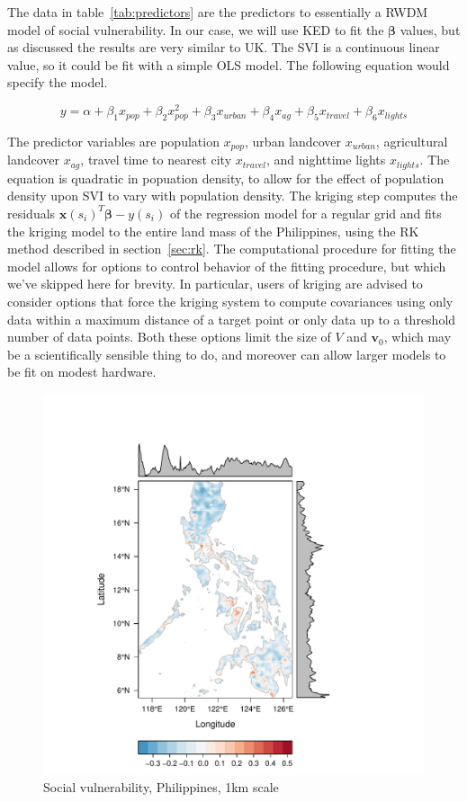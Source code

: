 \documentclass[draft]{article}
\begin{document}
The data in table~\ref{tab:predictors} are the predictors to essentially a RWDM model of social vulnerability.  In our case, we will use KED to fit the $\bm{\beta}$ values, but as discussed the results are very similar to UK.  The SVI is a continuous linear value, so it could be fit with a simple OLS model.  The following equation would specify the model.

\[y=\alpha+\beta_1x_{pop}+\beta_2x_{pop}^2+\beta_3x_{urban}+\beta_4x_{ag}+\beta_5x_{travel}+\beta_6x_{lights}\]

The predictor variables are population $x_{pop}$, urban landcover $x_{urban}$, agricultural landcover $x_{ag}$, travel time to nearest city $x_{travel}$, and nighttime lights $x_{lights}$.  The equation is quadratic in popuation density, to allow for the effect of population density upon SVI to vary with population density.  The kriging step computes the residuals $\bm{x}(s_i)^T \bm{\beta} - y(s_i)$ of the regression model for a regular grid and fits the kriging model to the entire land mass of the Philippines, using the RK method described in section~\ref{sec:rk}.  The computational procedure for fitting the model allows for options to control behavior of the fitting procedure, but which we've skipped here for brevity.  In particular, users of kriging are advised to consider options that force the kriging system to compute covariances using only data within a maximum distance of a target point or only data up to a threshold number of data points.  Both these options limit the size of $V$ and $\bm{v}_0$, which may be a scientifically sensible thing to do, and moreover can allow larger models to be fit on modest hardware.

\begin{figure}
  \centering
  \includegraphics[width=0.4\textheight]{svi.pdf}
  \caption{Social vulnerability, Philippines, 1km scale} \label{fig:svi}
\end{figure}
\end{document}
